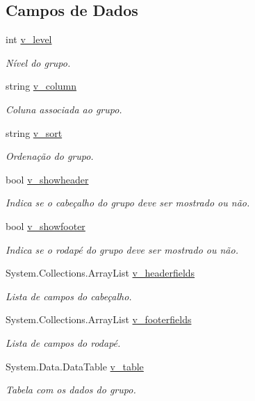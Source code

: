 \subsection*{Campos de Dados}
\begin{DoxyCompactItemize}
\item 
int \hyperlink{classSpartacus_1_1Reporting_1_1Group_ad03ba0ca3bafb618636d12e3b0cde769}{v\+\_\+level}
\begin{DoxyCompactList}\small\item\em Nível do grupo. \end{DoxyCompactList}\item 
string \hyperlink{classSpartacus_1_1Reporting_1_1Group_a71fecca561ec4ef4f0993fb31ef092da}{v\+\_\+column}
\begin{DoxyCompactList}\small\item\em Coluna associada ao grupo. \end{DoxyCompactList}\item 
string \hyperlink{classSpartacus_1_1Reporting_1_1Group_ad14e2725db3cfe13ed3aac4fd065a75d}{v\+\_\+sort}
\begin{DoxyCompactList}\small\item\em Ordenação do grupo. \end{DoxyCompactList}\item 
bool \hyperlink{classSpartacus_1_1Reporting_1_1Group_aac918ded62cf2fff07c06228295939f9}{v\+\_\+showheader}
\begin{DoxyCompactList}\small\item\em Indica se o cabeçalho do grupo deve ser mostrado ou não. \end{DoxyCompactList}\item 
bool \hyperlink{classSpartacus_1_1Reporting_1_1Group_a8c985f0be6cddc7e602ee3d0cb167cdb}{v\+\_\+showfooter}
\begin{DoxyCompactList}\small\item\em Indica se o rodapé do grupo deve ser mostrado ou não. \end{DoxyCompactList}\item 
System.\+Collections.\+Array\+List \hyperlink{classSpartacus_1_1Reporting_1_1Group_ad05edcde1836bcf084d12ef6a204d244}{v\+\_\+headerfields}
\begin{DoxyCompactList}\small\item\em Lista de campos do cabeçalho. \end{DoxyCompactList}\item 
System.\+Collections.\+Array\+List \hyperlink{classSpartacus_1_1Reporting_1_1Group_aeaed3d9bfe7a89a49f816cb07c827517}{v\+\_\+footerfields}
\begin{DoxyCompactList}\small\item\em Lista de campos do rodapé. \end{DoxyCompactList}\item 
System.\+Data.\+Data\+Table \hyperlink{classSpartacus_1_1Reporting_1_1Group_a589c6ed49699af44ceefd1ec283de54c}{v\+\_\+table}
\begin{DoxyCompactList}\small\item\em Tabela com os dados do grupo. \end{DoxyCompactList}\end{DoxyCompactItemize}


